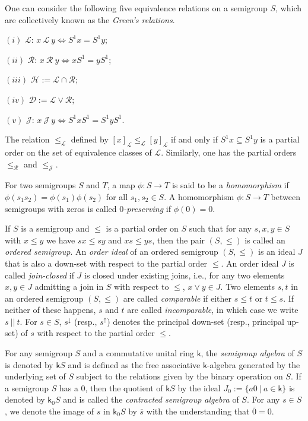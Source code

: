 \documentclass[a4paper,reqno,11pt]{amsart}
\numberwithin{equation}{section}
\theoremstyle{definition}
\theoremstyle{remark}
\begin{document}
One can consider the following five equivalence relations on a semigroup $S$, which are collectively known as the \emph{Green's relations}.

$(i)$ $\mathscr{L}$: $x~\mathscr{L}~y\Leftrightarrow S^1 x=S^1 y$;

$(ii)$ $\mathscr{R}$: $x~\mathscr{R}~y\Leftrightarrow xS^1=yS^1$;

$(iii)$ $\mathscr{H}:=\mathscr{L}\cap \mathscr{R}$;

$(iv)$ $\mathscr{D}:=\mathscr{L}\vee \mathscr{R}$;

$(v)$ $\mathscr{J}$: $x~\mathscr{J}~y\Leftrightarrow S^1 x S^1=S^1 y S^1$.

The relation $\le_{\mathscr{L}}$ defined by $[x]_{\mathscr{L}}\le_{\mathscr{L}}[y]_{\mathscr{L}}$ if and only if $S^1x\subseteq S^1y$ is a partial order on the set of equivalence classes of $\mathscr{L}$. Similarly, one has the partial orders $\le_{\mathscr{R}}$ and $\le_{\mathscr{J}}$.

For two semigroups $S$ and $T$, a map $\phi:S\longrightarrow T$ is said to be a \emph{homomorphism} if $\phi(s_1s_2)=\phi(s_1)\phi(s_2)$ for all $s_1,s_2\in S$. A homomorphism $\phi:S\longrightarrow T$ between semigroups with zeros is called \emph{$0$-preserving} if $\phi(0)=0$. 

If $S$ is a semigroup and $\leqslant$ is a partial order on $S$ such that for any $s,x,y\in S$ with $x\leqslant y$ we have $sx\leqslant sy$ and $xs\leqslant ys$, then the pair $(S,\leqslant)$ is called an \emph{ordered semigroup}. An \emph{order ideal} of an ordered semigroup $(S,\leqslant)$ is an ideal $J$ that is also a down-set with respect to the partial order $\leqslant$. An order ideal $J$ is called \emph{join-closed} if $J$ is closed under existing joins, i.e., for any two elements $x,y\in J$ admitting a join in $S$ with respect to $\leqslant$, $x\vee y\in J$. Two elements $s,t$ in an ordered semigroup $(S,\leqslant)$ are called \emph{comparable} if either $s\leqslant t$ or $t\leqslant s$. If neither of these happens, $s$ and $t$ are called \emph{incomparable}, in which case we write $s~||~t$. For $s\in S$, $s^{\downarrow}$ (resp., $s^{\uparrow}$) denotes the principal down-set (resp., principal up-set) of $s$ with respect to the partial order $\leqslant$.

For any semigroup $S$ and a commutative unital ring $\mathsf{k}$, the \emph{semigroup algebra} of $S$ is denoted by $\mathsf{k}S$ and is defined as the free associative $\mathsf{k}$-algebra generated by the underlying set of $S$ subject to the relations given by the binary operation on $S$. If a semigroup $S$ has a $0$, then the quotient of $\mathsf{k}S$ by the ideal $J_0:=\{a0~|~a\in \mathsf{k}\}$ is denoted by $\mathsf{k}_0S$ and is called the \emph{contracted semigroup algebra} of $S$. For any $s\in S$, we denote the image of $s$ in $\mathsf{k}_0S$ by $\overline{s}$ with the understanding that $\overline{0}=0$.
\end{document}

